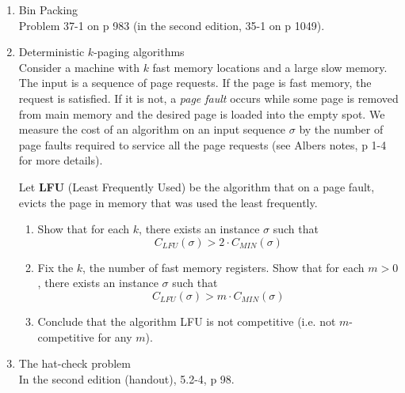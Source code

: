 \documentclass[11pt]{article}
\begin{document}
\begin{enumerate}
    \item Bin Packing\\
	Problem 37-1 on p 983
	(in the second edition, 35-1 on p 1049).
    \item Deterministic $k$-paging algorithms\\
	Consider a machine with $k$ fast memory locations and a 
	large slow memory.  The input is a sequence of page requests.
	If the page is fast memory, the request is satisfied.  If it
	is not, a {\em page fault} occurs while some page is removed
	from main memory and the desired page is loaded into the 
	empty spot.  We measure the cost of an algorithm on an input
	sequence $\sigma$ by the number of page faults required to 
	service all the page requests
	(see Albers notes, p 1-4 for more details).

	Let {\bf LFU} (Least Frequently Used) be the algorithm that on
	a page fault, evicts the page in memory that was used the 
	least frequently.
	\begin{enumerate}
	    \item Show that for each $k$, there exists an instance
		$\sigma$ such that
		$$
		    C_{LFU}(\sigma) > 2 \cdot C_{MIN}(\sigma)
		$$
	    \item Fix the $k$, the number of fast memory registers.
		Show that for each $m > 0$, there exists an instance
		$\sigma$ such that
		$$
		    C_{LFU}(\sigma) > m \cdot C_{MIN}(\sigma)
		$$
	    \item Conclude that the algorithm LFU is not competitive
		(i.e. not $m$-competitive for any $m$).
	\end{enumerate}
	
    \item The hat-check problem\\
	In the second edition (handout), 5.2-4, p 98.
	
\end{enumerate}
\end{document}
